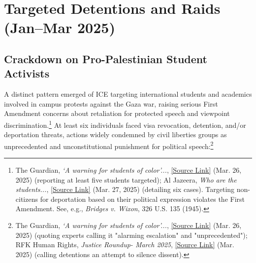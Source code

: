 \documentclass[11pt, letterpaper]{article}
\begin{document}
\section*{Targeted Detentions and Raids (Jan–Mar 2025)}

\subsection*{Crackdown on Pro-Palestinian Student Activists}
A distinct pattern emerged of ICE targeting international students and academics involved in campus protests against the Gaza war, raising serious First Amendment concerns about retaliation for protected speech and viewpoint discrimination.\footnote{The Guardian, \emph{‘A warning for students of color’...}, \href{https://www.theguardian.com/us-news/2025/mar/26/us-universities-students-israel-palestine-protests\#:~:text=Now\%2C\%20at\%20least\%20five\%20students,over\%20their\%20support\%20of\%20Palestine}{[Source Link]} (Mar. 26, 2025) (reporting at least five students targeted); Al Jazeera, \emph{Who are the students...}, \href{https://www.aljazeera.com/news/2025/3/27/who-are-the-students-trump-wants-to-deport}{[Source Link]} (Mar. 27, 2025) (detailing six cases). Targeting non-citizens for deportation based on their political expression violates the First Amendment. See, e.g., \textit{Bridges v. Wixon}, 326 U.S. 135 (1945).} At least six individuals faced visa revocation, detention, and/or deportation threats, actions widely condemned by civil liberties groups as unprecedented and unconstitutional punishment for political speech:\footnote{The Guardian, \emph{‘A warning for students of color’...}, \href{https://www.theguardian.com/us-news/2025/mar/26/us-universities-students-israel-palestine-protests\#:~:text=The\%20targeting\%20of\%20immigrant\%20students,\%E2\%80\%9D}{[Source Link]} (Mar. 26, 2025) (quoting experts calling it "alarming escalation" and "unprecedented"); RFK Human Rights, \emph{Justice Roundup- March 2025}, \href{https://www.linkedin.com/pulse/justice-roundup-march-2025-rfkhumanrights-glnxe\#:~:text=The\%20Central\%20Louisiana\%20ICE\%20Processing,light\%20on\%20egregious\%20human\%20rights}{[Source Link]} (Mar. 2025) (calling detentions an attempt to silence dissent).}
\end{document}
